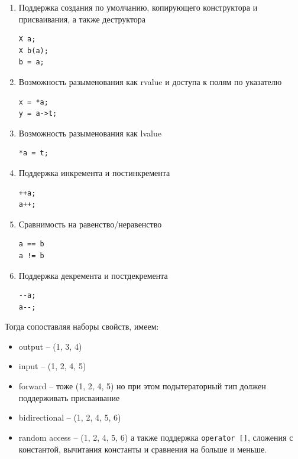 \documentclass[a4paper,12pt,oneside]{book}
\begin{document}
\begin {enumerate}
\item
Поддержка создания по умолчанию, копирующего конструктора и присваивания, а также деструктора

\begin{lstlisting}
X a;
X b(a);
b = a;
\end{lstlisting}

\item
Возможность разыменования как rvalue и доступа к полям по указателю

\begin{lstlisting}
x = *a;
y = a->t;
\end{lstlisting}

\item
Возможность разыменования как lvalue

\begin{lstlisting}
*a = t;
\end{lstlisting}

\item
Поддержка инкремента и постинкремента

\begin{lstlisting}
++a;
a++;
\end{lstlisting}

\item
Сравнимость на равенство/неравенство

\begin{lstlisting}
a == b
a != b
\end{lstlisting}

\item
Поддержка декремента и постдекремента

\begin{lstlisting}
--a;
a--;
\end{lstlisting}

\end {enumerate}

Тогда сопоставляя наборы свойств, имеем:

\begin {itemize}
\item output -- (1, 3, 4)
\item input -- (1, 2, 4, 5)
\item forward -- тоже (1, 2, 4, 5) но при этом подытераторный тип должен поддерживать присваивание
\item bidirectional -- (1, 2, 4, 5, 6)
\item random access -- (1, 2, 4, 5, 6) а также поддержка \lstinline!operator []!, сложения с константой, вычитания константы и сравнения на больше и меньше.
\end {itemize}
\end{document}
